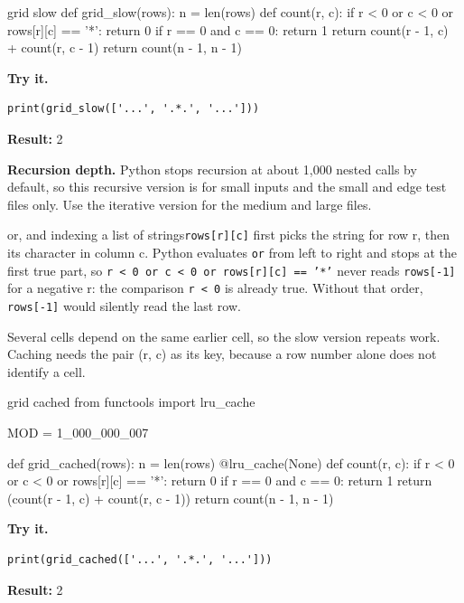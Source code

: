 \documentclass[11pt,a4paper,oneside]{report}
\begin{document}
\begin{bookcode}{grid slow}
def grid_slow(rows):
    n = len(rows)
    def count(r, c):
        if r < 0 or c < 0 or rows[r][c] == '*':
            return 0
        if r == 0 and c == 0:
            return 1
        return count(r - 1, c) + count(r, c - 1)
    return count(n - 1, n - 1)
\end{bookcode}
\textbf{Try it.}

\begin{lstlisting}
print(grid_slow(['...', '.*.', '...']))
\end{lstlisting}
\textbf{Result:} 2

\textbf{Recursion depth.} Python stops recursion at about 1,000 nested calls by default, so this recursive version is for small inputs and the small and edge test files only. Use the iterative version for the medium and large files.

\begin{pythonnote}{or, and indexing a list of strings}\texttt{rows[r][c]} first picks the string for row r, then its character in column c. Python evaluates \texttt{or} from left to right and stops at the first true part, so \texttt{r < 0 or c < 0 or rows[r][c] == '*'} never reads \texttt{rows[-1]} for a negative r: the comparison \texttt{r < 0} is already true. Without that order, \texttt{rows[-1]} would silently read the last row.\end{pythonnote}
Several cells depend on the same earlier cell, so the slow version repeats work. Caching needs the pair (r, c) as its key, because a row number alone does not identify a cell.

\begin{bookcode}{grid cached}
from functools import lru_cache

MOD = 1_000_000_007

def grid_cached(rows):
    n = len(rows)
    @lru_cache(None)
    def count(r, c):
        if r < 0 or c < 0 or rows[r][c] == '*':
            return 0
        if r == 0 and c == 0:
            return 1
        return (count(r - 1, c) + count(r, c - 1)) %
    return count(n - 1, n - 1)
\end{bookcode}
\textbf{Try it.}

\begin{lstlisting}
print(grid_cached(['...', '.*.', '...']))
\end{lstlisting}
\textbf{Result:} 2
\end{document}
